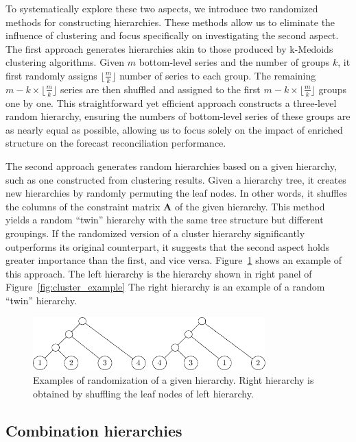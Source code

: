 \documentclass[a4paper,review,12pt,authoryear]{elsarticle}
\begin{document}
To systematically explore these two aspects, we introduce two randomized methods for constructing hierarchies. These methods allow us to eliminate the influence of clustering and focus specifically on investigating the second aspect. 
The first approach generates hierarchies akin to those produced by k-Medoids clustering algorithms. Given $m$ bottom-level series and the number of groups $k$, it first randomly assigns $ \lfloor \frac{m}{k}\rfloor$ number of series to each group. The remaining $m -  k\times\lfloor\frac{m}{k}\rfloor$ series are then shuffled and assigned to the first $m -  k\times\lfloor\frac{m}{k}\rfloor$ groups one by one. 
This straightforward yet efficient approach constructs a three-level random hierarchy, ensuring the numbers of bottom-level series of these groups  are as nearly equal as possible, allowing us to focus solely on the impact of enriched structure on the forecast reconciliation performance. 

The second approach generates random hierarchies based on a given hierarchy, such as one constructed from clustering results. Given a hierarchy tree, it creates new hierarchies by randomly permuting the leaf nodes. In other words, it shuffles the columns of the constraint matrix $\boldsymbol{A}$ of the given hierarchy. This method yields a random ``twin'' hierarchy with the same tree structure but different groupings. If the randomized version of a cluster hierarchy significantly outperforms its original counterpart, it suggests that the second aspect holds greater importance than the first, and vice versa. Figure~\ref{fig:aggcluster_random} shows an example of this approach. The left hierarchy is the hierarchy shown in right panel of Figure~\ref{fig:cluster_example} The right hierarchy is an example of a random ``twin'' hierarchy.

\begin{figure}
    \centering
    \includegraphics[width=0.8\textwidth]{figures/aggcluster_random.pdf}
    \caption{\label{fig:aggcluster_random}Examples of randomization of a given hierarchy. Right hierarchy is obtained by shuffling the leaf nodes of left hierarchy.}
\end{figure}

\subsection{Combination hierarchies}
\label{sec:combination}
\end{document}
